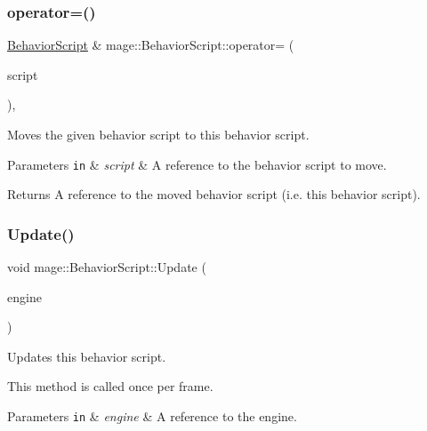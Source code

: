 \subsubsection{\texorpdfstring{operator=()}{operator=()}\hspace{0.1cm}{\footnotesize\ttfamily [2/2]}}
{\footnotesize\ttfamily \mbox{\hyperlink{classmage_1_1_behavior_script}{Behavior\+Script}} \& mage\+::\+Behavior\+Script\+::operator= (\begin{DoxyParamCaption}\item[{\mbox{\hyperlink{classmage_1_1_behavior_script}{Behavior\+Script}} \&\&}]{script }\end{DoxyParamCaption})\hspace{0.3cm}{\ttfamily [default]}, {\ttfamily [noexcept]}}

Moves the given behavior script to this behavior script.


\begin{DoxyParams}[1]{Parameters}
\mbox{\tt in}  & {\em script} & A reference to the behavior script to move. \\
\hline
\end{DoxyParams}
\begin{DoxyReturn}{Returns}
A reference to the moved behavior script (i.\+e. this behavior script). 
\end{DoxyReturn}
\mbox{\label{classmage_1_1_behavior_script_a085634661326b59850c1111e537baa4e}} 
\subsubsection{\texorpdfstring{Update()}{Update()}}
{\footnotesize\ttfamily void mage\+::\+Behavior\+Script\+::\+Update (\begin{DoxyParamCaption}\item[{\mbox{[}\mbox{[}maybe\+\_\+unused\mbox{]} \mbox{]} \mbox{\hyperlink{classmage_1_1_engine}{Engine}} \&}]{engine }\end{DoxyParamCaption})\hspace{0.3cm}{\ttfamily [virtual]}}

Updates this behavior script.

This method is called once per frame.


\begin{DoxyParams}[1]{Parameters}
\mbox{\tt in}  & {\em engine} & A reference to the engine. \\
\hline
\end{DoxyParams}

